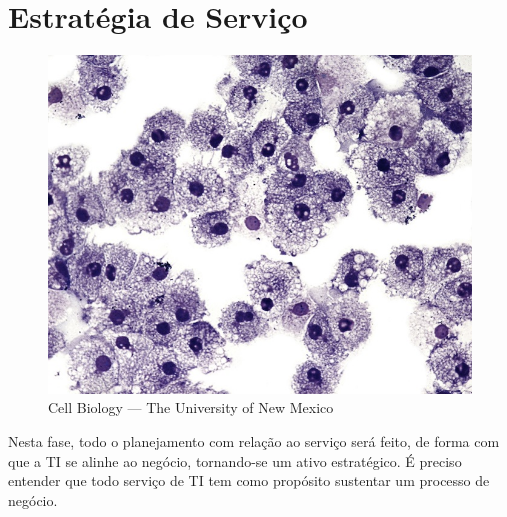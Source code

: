 %
%
%
%


\chapter{Estratégia de Serviço}
\label{cha:estrat}


\begin{figure}
    \centering
    \includegraphics[width=1\textwidth]{img/cell_biology}\\
    {\scriptsize Cell Biology --- The University of New Mexico}
\end{figure}

Nesta fase, todo o planejamento com relação ao serviço será feito, de forma com
que a TI se alinhe ao negócio, tornando-se um ativo estratégico. É preciso
entender que todo serviço de TI tem como propósito sustentar um processo de
negócio.

